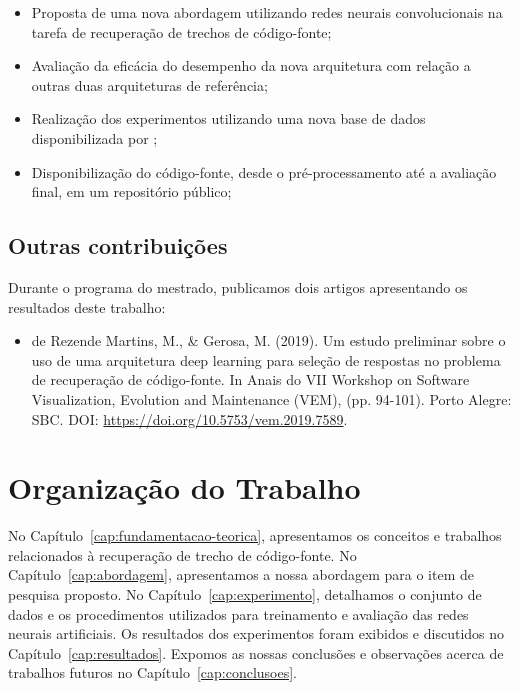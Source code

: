 \begin{itemize}
\item Proposta de uma nova abordagem utilizando redes neurais convolucionais na tarefa de recuperação de trechos de código-fonte;
\item Avaliação da eficácia do desempenho da nova arquitetura com relação a outras duas arquiteturas de referência;
\item Realização dos experimentos utilizando uma nova base de dados disponibilizada por \cite{yao-2018};
\item Disponibilização do código-fonte, desde o pré-processamento até a avaliação final, em um repositório público;
\end{itemize}

\subsection{Outras contribuições}

Durante o programa do mestrado, publicamos dois artigos apresentando os resultados deste trabalho:

\begin{itemize}
    \item de Rezende Martins, M., \& Gerosa, M. (2019). Um estudo preliminar sobre o uso de uma arquitetura deep learning para seleção de respostas no problema de recuperação de código-fonte. In Anais do VII Workshop on Software Visualization, Evolution and Maintenance (VEM), (pp. 94-101). Porto Alegre: SBC. DOI: \url{https://doi.org/10.5753/vem.2019.7589}.
\end{itemize}


\section{Organização do Trabalho}
\label{sec:organizacao_trabalho}

No Capítulo~\ref{cap:fundamentacao-teorica}, apresentamos os conceitos e trabalhos relacionados à recuperação de trecho de código-fonte. No Capítulo~\ref{cap:abordagem}, apresentamos a nossa abordagem para o item de pesquisa proposto. No Capítulo~\ref{cap:experimento}, detalhamos o conjunto de dados e os procedimentos utilizados para treinamento e avaliação das redes neurais artificiais. Os resultados dos experimentos foram exibidos e discutidos no Capítulo~\ref{cap:resultados}. Expomos as nossas conclusões e observações acerca de trabalhos futuros no Capítulo~\ref{cap:conclusoes}.